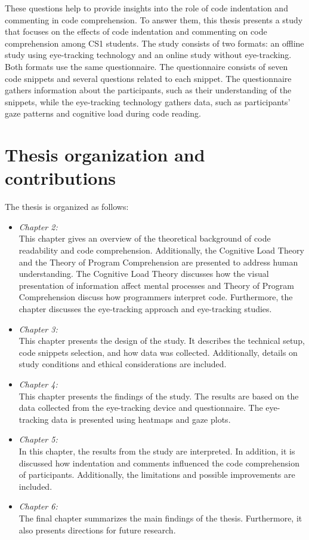These questions help to provide insights into the role of code indentation and commenting in code comprehension. 
To answer them, this thesis presents a study that focuses on the effects of code indentation and commenting on code comprehension among CS1 students.
The study consists of two formats: an offline study using eye-tracking technology and an online study without eye-tracking. Both formats use the same questionnaire. The questionnaire consists of seven code snippets and several questions related to each snippet. The questionnaire gathers information about the participants, such as their understanding of the snippets, while the eye-tracking technology gathers data, such as participants’ gaze patterns and cognitive load during code reading.  

\section{Thesis organization and contributions}

The thesis is organized as follows:
\begin{itemize}

\item[] \emph{Chapter 2:} 
\\This chapter gives an overview of the theoretical background of code readability and code comprehension. Additionally, the Cognitive Load Theory and the Theory of Program Comprehension are presented to address human understanding. The Cognitive Load Theory discusses how the visual presentation of information  affect mental processes and Theory of Program Comprehension discuss how programmers interpret code. 
Furthermore, the chapter discusses the eye-tracking approach and eye-tracking studies.  


\item[] \emph{Chapter 3:}
\\This chapter presents the design of the study. It describes the technical setup, code snippets selection, and how data was collected. Additionally, details on study conditions and ethical considerations are included.


\item[] \emph{Chapter 4:} 
\\ This chapter presents the findings of the study. The results are based on the data collected from the eye-tracking device and questionnaire. The eye-tracking data is presented using heatmaps and gaze plots.


\item[] \emph{Chapter 5:} 
\\In this chapter, the results from the study are interpreted. In addition, it is discussed how indentation and comments influenced the code comprehension of participants. Additionally, the limitations and possible improvements are included.

\item[] \emph{Chapter 6:} 
\\The final chapter summarizes the main findings of the thesis. Furthermore, it also presents directions for future research.

\end{itemize}


